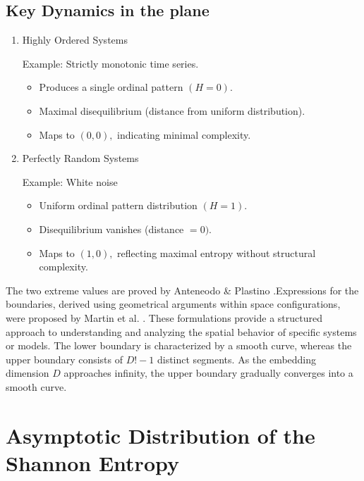 \subsection{Key Dynamics in the plane}
\begin{enumerate}
	\item Highly Ordered Systems
	
	Example: Strictly monotonic time series.
	\begin{itemize}
		\item Produces a single ordinal pattern $(H=0)$.
		
		\item Maximal disequilibrium (distance from uniform distribution).
		
		\item Maps to $(0,0),$ indicating minimal complexity.
	\end{itemize}
	
	\item Perfectly Random Systems
	
	Example: White noise
	\begin{itemize}
		\item Uniform ordinal pattern distribution $(H=1)$.
		\item Disequilibrium vanishes (distance $=0)$.
		\item Maps to $(1,0),$ reflecting maximal entropy without structural complexity.
	\end{itemize}
\end{enumerate}
The two extreme values are proved by Anteneodo \& Plastino \cite{anteneodo1996some}.Expressions for the boundaries, derived using geometrical arguments within space configurations, were proposed by Martin et al. \cite{Martin2006}. These formulations provide a structured approach to understanding and analyzing the spatial behavior of specific systems or models. The lower boundary is characterized by a smooth curve, whereas the upper boundary consists of $D!-1$ distinct segments. As the embedding dimension $D$ approaches infinity, the upper boundary gradually converges into a smooth curve. 

\section {Asymptotic Distribution of the Shannon Entropy}

